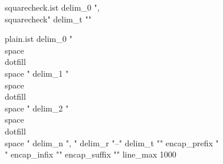 



\begin{filecontents*}{squarecheck.ist}
delim_0 ", \\squarecheck{"
delim_t "}"
\end{filecontents*}

\begin{filecontents*}{plain.ist}
delim_0 "\\space\\dotfill\\space "\hss
delim_1 "\\space\\dotfill\\space "\hss
delim_2 "\\space\\dotfill\\space "\hss
delim_n ", "
delim_r "--"
delim_t ""
encap_prefix "\\"
encap_infix "{"
encap_suffix "}"
line_max 1000
\end{filecontents*}
